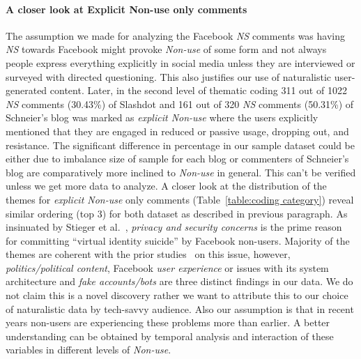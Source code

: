 \paragraph{A closer look at Explicit Non-use only comments}

The assumption we made for analyzing the Facebook \emph{NS} comments was having \emph{NS} towards Facebook might provoke \emph{Non-use} of some form and not always people express everything explicitly in social media unless they are interviewed or surveyed with directed questioning. This also justifies our use of naturalistic user-generated content. Later, in the second level of thematic coding 311 out of 1022 \emph{NS} comments (30.43\%) of Slashdot and 161 out of 320 \emph{NS} comments (50.31\%) of Schneier's blog was marked as \emph{explicit Non-use} where the users explicitly mentioned that they are engaged in reduced or passive usage, dropping out, and resistance. The significant difference in percentage in our sample dataset could be either due to imbalance size of sample for each blog or commenters of Schneier's blog are comparatively more inclined to \emph{Non-use} in general. This can't be verified unless we get more data to analyze. A closer look at the distribution of the themes for \emph{explicit Non-use} only comments (Table~\ref{table:coding category}) reveal similar ordering (top 3) for both dataset as described in previous paragraph. As insinuated by Stieger et al.~\cite{stieger2013commits}, \textit{privacy and security concerns} is the prime reason for committing ``virtual identity suicide'' by Facebook non-users. Majority of the themes are coherent with the prior studies~\cite{lampe2013users, baumer2013limiting, baker2011their} on this issue, however, \textit{politics/political content}, Facebook \textit{user experience} or issues with its system architecture and \textit{fake accounts/bots} are three distinct findings in our data. We do not claim this is a novel discovery rather we want to attribute this to our choice of naturalistic data by tech-savvy audience. Also our assumption is that in recent years non-users are experiencing these problems more than earlier. A better understanding can be obtained by temporal analysis and interaction of these variables in different levels of \textit{Non-use}.

